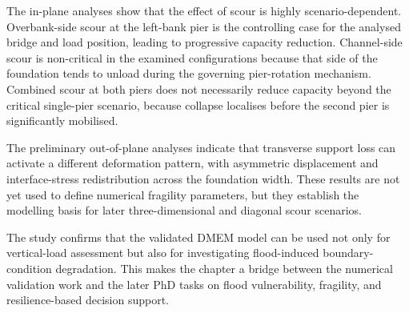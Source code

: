 The in-plane analyses show that the effect of scour is highly scenario-dependent. Overbank-side scour at the left-bank pier is the controlling case for the analysed bridge and load position, leading to progressive capacity reduction. Channel-side scour is non-critical in the examined configurations because that side of the foundation tends to unload during the governing pier-rotation mechanism. Combined scour at both piers does not necessarily reduce capacity beyond the critical single-pier scenario, because collapse localises before the second pier is significantly mobilised.

The preliminary out-of-plane analyses indicate that transverse support loss can activate a different deformation pattern, with asymmetric displacement and interface-stress redistribution across the foundation width. These results are not yet used to define numerical fragility parameters, but they establish the modelling basis for later three-dimensional and diagonal scour scenarios.

The study confirms that the validated \gls{DMEM} model can be used not only for vertical-load assessment but also for investigating flood-induced boundary-condition degradation. This makes the chapter a bridge between the numerical validation work and the later PhD tasks on flood vulnerability, fragility, and resilience-based decision support.



